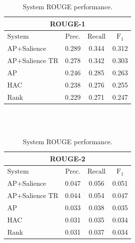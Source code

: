 \begin{table}[h]
\centering
\begin{tabular}{l c c c}
\multicolumn{4}{c}{ROUGE-1}\\
\hline
\hline
$\mathrm{System}$ & $\mathrm{Prec.}$ & $\mathrm{Recall}$ & $\mathrm{F}_1$\\
[0.5ex]
\hline
AP+Salience &          0.289   &    0.344  &  0.312  \\
AP+Salience TR &       0.278   &    0.342  &  0.303 \\
AP    &         0.246   &    0.285  &  0.263 \\
HAC     &        0.238   &    0.276  &  0.255 \\
Rank    &        0.229   &    0.271  &  0.247 \\
\hline %
\end{tabular}
~\\[1ex]
~\\
\begin{tabular}{l c c c}
\multicolumn{4}{c}{ROUGE-2}\\
\hline
\hline
$\mathrm{System}$ & $\mathrm{Prec.}$ & $\mathrm{Recall}$ & $\mathrm{F}_1$\\[0.5ex]
\hline
AP+Salience & 0.047 &     0.056 &   0.051 \\
AP+Salience TR & 0.044  &    0.054 &  0.047 \\
AP & 0.033  &    0.038 &  0.035 \\
HAC & 0.031  &    0.035 &  0.034 \\
Rank & 0.031  &    0.037 &  0.034 \\
\hline %
\end{tabular}
\caption{System ROUGE performance.} %
\label{tab:rouge}
\end{table}

